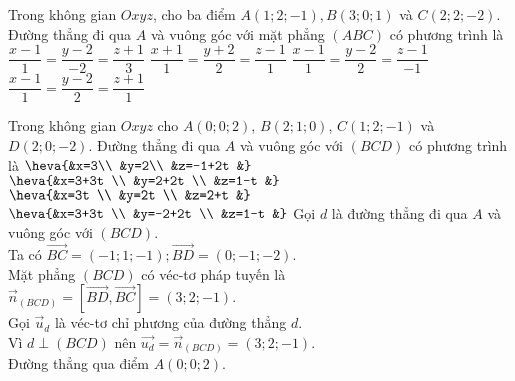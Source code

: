 \begin{ex}%
	Trong không gian $Oxyz$, cho ba điểm $A(1; 2;-1), B(3; 0; 1)$ và $C(2; 2;-2)$. Đường thẳng đi qua $A$ và vuông góc với mặt phẳng $(ABC)$ có phương trình là
	\choice
	{\True $\dfrac{x-1}{1}=\dfrac{y-2}{-2}=\dfrac{z+1}{3}$}
	{$\dfrac{x+1}{1}=\dfrac{y+2}{2}=\dfrac{z-1}{1}$}
	{$\dfrac{x-1}{1}=\dfrac{y-2}{2}=\dfrac{z-1}{-1}$}
	{$\dfrac{x-1}{1}=\dfrac{y-2}{2}=\dfrac{z+1}{1}$}
\end{ex}
\begin{ex}%
	Trong không gian $Oxyz$ cho $A(0; 0; 2)$, $B(2; 1; 0)$, $C(1; 2;-1)$ và $D(2; 0;-2)$. Đường thẳng đi qua $A$ và vuông góc với $(BCD)$ có phương trình là
	\choice
	{$\heva{&x=3\\
			&y=2\\
			&z=-1+2t
			&}$}
	{\True $\heva{&x=3+3t \\
			&y=2+2t \\
			&z=1-t
			&}$}
	{$\heva{&x=3t \\
			&y=2t \\
			&z=2+t
			&}$}
	{$\heva{&x=3+3t \\
			&y=-2+2t \\
			&z=1-t
			&}$}
	\loigiai
		{Gọi $d$ là đường thẳng đi qua $A$ và vuông góc với $(BCD)$.\\
		Ta có $\overrightarrow{BC}=(-1; 1;-1); \overrightarrow{BD}=(0;-1;-2)$.\\
		Mặt phẳng $(BCD)$ có véc-tơ pháp tuyến là $\overrightarrow{n}_{(BCD)}=\left[\overrightarrow{BD}, \overrightarrow{BC}\right]=(3; 2;-1)$.\\
		Gọi $\overrightarrow{u}_d$ là véc-tơ chỉ phương của đường thẳng $d$.\\
		Vì $d \perp(BCD)$ nên $\overrightarrow{u_d}=\overrightarrow{n}_{(BCD)}=(3; 2;-1)$.\\
		Đường thẳng qua điểm $A(0; 0; 2)$.
	}
\end{ex}
